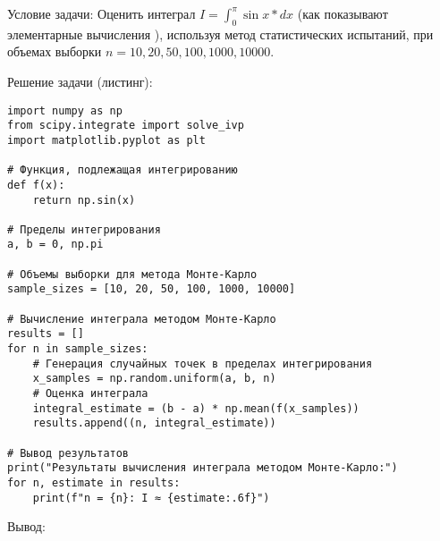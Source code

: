 Условие задачи: Оценить интеграл $I = \int^{\pi}_{0}\sin{x*dx}$ (как показывают элементарные вычисления ), используя метод статистических испытаний, при объемах выборки $n = 10, 20, 50, 100, 1000, 10000$.

Решение задачи (листинг):

\begin{verbatim}
import numpy as np
from scipy.integrate import solve_ivp
import matplotlib.pyplot as plt

# Функция, подлежащая интегрированию
def f(x):
    return np.sin(x)

# Пределы интегрирования
a, b = 0, np.pi

# Объемы выборки для метода Монте-Карло
sample_sizes = [10, 20, 50, 100, 1000, 10000]

# Вычисление интеграла методом Монте-Карло
results = []
for n in sample_sizes:
    # Генерация случайных точек в пределах интегрирования
    x_samples = np.random.uniform(a, b, n)
    # Оценка интеграла
    integral_estimate = (b - a) * np.mean(f(x_samples))
    results.append((n, integral_estimate))

# Вывод результатов
print("Результаты вычисления интеграла методом Монте-Карло:")
for n, estimate in results:
    print(f"n = {n}: I ≈ {estimate:.6f}")
\end{verbatim}

Вывод:
